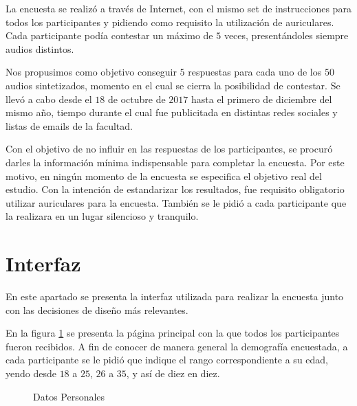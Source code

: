 La encuesta se realizó a través de Internet, con el mismo set de instrucciones para todos los participantes y pidiendo como requisito la utilización de auriculares. Cada participante podía contestar un máximo de $5$ veces, presentándoles siempre audios distintos.

Nos propusimos como objetivo conseguir $5$ respuestas para cada uno de los $50$ audios sintetizados, momento en el cual se cierra la posibilidad de contestar. Se llevó a cabo desde el $18$ de octubre de $2017$ hasta el primero de diciembre del mismo año, tiempo durante el cual fue publicitada en distintas redes sociales y listas de emails de la facultad.

Con el objetivo de no influir en las respuestas de los participantes, se procuró darles la información mínima indispensable para completar la encuesta. Por este motivo, en ningún momento de la encuesta se especifica el objetivo real del estudio. Con la intención de estandarizar los resultados, fue requisito obligatorio utilizar auriculares para la encuesta. También se le pidió a cada participante que la realizara en un lugar silencioso y tranquilo.

\section{Interfaz}\label{interfaz}

En este apartado se presenta la interfaz utilizada para realizar la encuesta junto con las decisiones de diseño más relevantes. 

En la figura \ref{personalData} se presenta la página principal con la que todos los participantes fueron recibidos. A fin de conocer de manera general la demografía encuestada, a cada participante se le pidió que indique el rango correspondiente a su edad, yendo desde $18$ a $25$, $26$ a $35$, y así de diez en diez.

\begin{figure}[htp]
\begin{center}
\end{center}
\caption{Datos Personales}
\label{personalData}
\end{figure}

